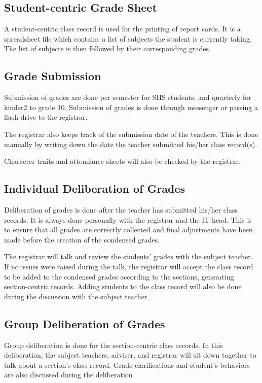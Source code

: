 \documentclass[11pt,a4paper,titlepage]{article}
\begin{document}
\subsection{Student-centric Grade Sheet}
A student-centric class record is used for the printing of report cards. It is a spreadsheet file which contains a list of subjects the student is currently taking. The list of subjects is then followed by their corresponding grades.

\subsection{Grade Submission}

Submission of grades are done per semester for SHS students, and quarterly for kinder2 to grade 10. Submission of grades is done through messenger or passing a flash drive to the registrar.

The registrar also keeps track of the submission date of the teachers. This is done manually by writing down the date the teacher submitted his/her class record(s).

Character traits and attendance sheets will also be checked by the registrar.

\subsection{Individual Deliberation of Grades}
Deliberation of grades is done after the teacher has submitted his/her class records. It is always done personally with the registrar and the IT head. This is to ensure that all grades are correctly collected and final adjustments have been made before the creation of the condensed grades. 

The registrar will talk and review the students' grades with the subject teacher. If no issues were raised during the talk, the registrar will accept the class record to be added to the condensed grades according to the sections, generating section-centric records. Adding students to the class record will also be done during the discussion with the subject teacher. 

\subsection{Group Deliberation of Grades}
Group deliberation is done for the section-centric class records. In this deliberation, the subject teachers, adviser, and registrar will sit down together to talk about a section's class record. Grade clarifications and student's behaviors are also discussed during the deliberation
\end{document}

